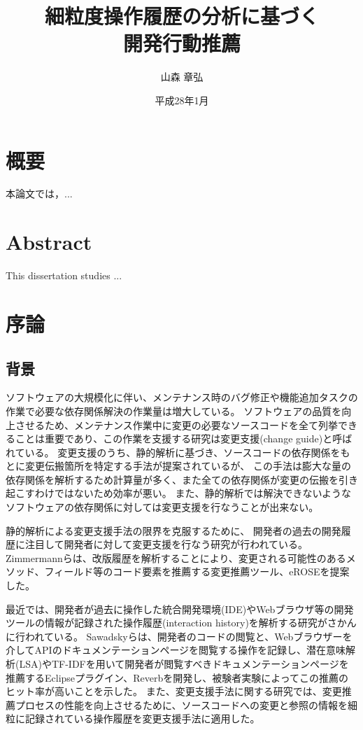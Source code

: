 \documentclass[a4paper]{jsbook}
\title{細粒度操作履歴の分析に基づく\\開発行動推薦}
\author{山森 章弘}
\date{平成28年1月}
\affiliation{大学院情報理工学研究科 計算工学専攻}
\begin{document}
\frontmatter
\maketitle

\chapter*{概要}
本論文では，...
\TODO{}

\chapter*{Abstract}
This dissertation studies ...
\TODO{}

\tableofcontents
\listoffigures
\listoftables

\mainmatter

\chapter{序論}
\section{背景}
ソフトウェアの大規模化に伴い、メンテナンス時のバグ修正や機能追加タスクの作業で必要な依存関係解決の作業量は増大している。
ソフトウェアの品質を向上させるため、メンテナンス作業中に変更の必要なソースコードを全て列挙できることは重要であり、この作業を支援する研究は変更支援(change guide)と呼ばれている。
変更支援のうち、静的解析に基づき、ソースコードの依存関係をもとに変更伝搬箇所を特定する手法が提案されている\cite{792645}が、
この手法は膨大な量の依存関係を解析するため計算量が多く、また全ての依存関係が変更の伝搬を引き起こすわけではないため効率が悪い\cite{Geipel:2009}。
また、静的解析では解決できないようなソフトウェアの依存関係に対しては変更支援を行なうことが出来ない\cite{5609732}。

静的解析による変更支援手法の限界を克服するために、
開発者の過去の開発履歴に注目して開発者に対して変更支援を行なう研究が行われている\cite{738508, Kagdi:2006}。
Zimmermannらは、改版履歴を解析することにより、変更される可能性のあるメソッド、フィールド等のコード要素を推薦する変更推薦ツール、eROSE\cite{Zimmermann:2005}を提案した。

最近では、開発者が過去に操作した統合開発環境(IDE)やWebブラウザ等の開発ツールの情報が記録された操作履歴(interaction history)\cite{rsse:2014}を解析する研究がさかんに行われている。
Sawadskyら\cite{Sawadsky:2013}は、開発者のコードの閲覧と、Webブラウザーを介してAPIのドキュメンテーションページを閲覧する操作を記録し、潜在意味解析(LSA)やTF-IDFを用いて開発者が閲覧すべきドキュメンテーションページを推薦するEclipseプラグイン、Reverbを開発し、被験者実験によってこの推薦のヒット率が高いことを示した。
また、変更支援手法に関する研究\cite{6233415,KatoJapanese:2011,ss2012-76,ss2013-84,Yamamori:2016}では、変更推薦プロセスの性能を向上させるために、ソースコードへの変更と参照の情報を細粒に記録されている操作履歴を変更支援手法に適用した。
\end{document}
